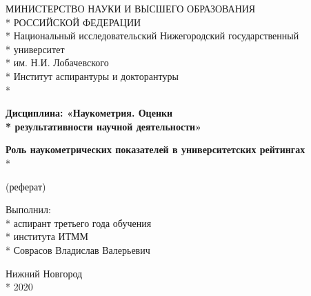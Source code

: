 \begin{titlepage}

\begin{center}
  МИНИСТЕРСТВО НАУКИ И ВЫСШЕГО ОБРАЗОВАНИЯ \\*
  РОССИЙСКОЙ ФЕДЕРАЦИИ \\*
Национальный исследовательский Нижегородский государственный \\*
университет \\*
им. Н.И. Лобачевского \\*
Институт аспирантуры и докторантуры \\*
\end{center}

\vspace{12pt}
\vspace{25pt}
\begin{center}
\fontsize{20pt}{0pt}
\textbf{Дисциплина: «Наукометрия. Оценки \\*
результативности научной деятельности»}
\end{center}
\vspace{30pt}

\begin{center}
\fontsize{20pt}{0pt}\textbf{Роль наукометрических показателей в университетских рейтингах} \\*

\end{center}

\begin{center}
(реферат)
\end{center}

\vspace{53pt}

\begin{flushright}
Выполнил: \\*
аспирант третьего года обучения\\*
института ИТММ\\*
Соврасов Владислав Валерьевич
\end{flushright}

\vspace{\fill}

\begin{center}
Нижний Новгород \\*
2020
\end{center}

\end{titlepage}
